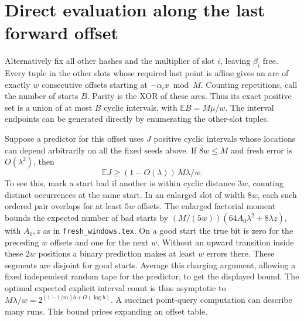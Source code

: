 \documentclass[11pt]{article}
\newcommand{\E}{\mathbb E}
\begin{document}
\section{Direct evaluation along the last forward offset}
Alternatively fix all other hashes and the multiplier of slot $i$,
leaving $\beta_i$ free. Every tuple in the other slots whose required
last point is affine gives an arc of exactly $w$ consecutive offsets
starting at $-\alpha_i x\bmod M$. Counting repetitions, call the number
of starts $B$. Parity is the XOR of these arcs. Thus its exact positive
set is a union of at most $B$ cyclic intervals, with
$\E B=M\mu/w$. The interval endpoints can be generated directly by
enumerating the other-slot tuples.

Suppose a predictor for this offset uses $J$ positive cyclic intervals
whose locations can depend arbitrarily on all the fixed seeds above.
If $8w\le M$ and fresh error is $O(\lambda^2)$, then
\[
                 \E J\ge (1-O(\lambda))\,M\lambda/w .
\]
To see this, mark a start bad if another is within cyclic distance
$3w$, counting distinct occurrences at the same start. In an enlarged
slot of width $8w$, each such ordered pair overlaps for at least $5w$
offsets. The enlarged factorial moment bounds the expected number of
bad starts by $(M/(5w))(64A_0\lambda^2+8\lambda z)$, with $A_0,z$ as
in \texttt{fresh\_windows.tex}. On a good start the true bit is zero
for the preceding $w$ offsets and one for the next $w$. Without an
upward transition inside these $2w$ positions a binary prediction
makes at least $w$ errors there. These segments are disjoint for good
starts. Average this charging argument, allowing a fixed independent
random tape for the predictor, to get the displayed bound.
The optimal expected explicit interval count is thus asymptotic to
$M\lambda/w=2^{(1-1/m)b+O(\log b)}$. A succinct point-query computation
can describe many runs. This bound prices expanding an offset table.
\end{document}
